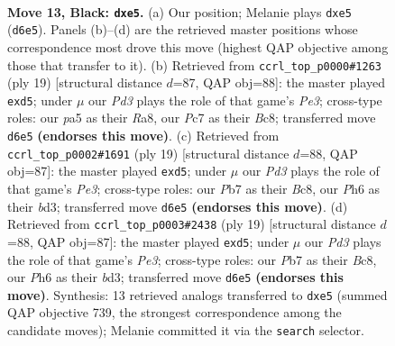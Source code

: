 \documentclass[11pt]{article}
\begin{document}
\clearpage

\begin{figure}[p]\centering
\begin{subfigure}{0.46\textwidth}\centering
\resizebox{\linewidth}{!}{%
\newchessgame
\chessboard[
  setfen={r1b1rk2/ppp1qpp1/2np1n1p/P3P2P/2P5/2P1PNP1/3B1P2/R2QKB1R b KQ - 0 13},
  showmover=false,
  pgfstyle=straightmove, color=movearrow, markmove={d6-e5}
]}
\caption{}
\end{subfigure}\hfill
\begin{subfigure}{0.46\textwidth}\centering
\resizebox{\linewidth}{!}{%
\newchessgame
\chessboard[
  setfen={r1bq1rk1/pp3pp1/2n1pn1p/2pP4/3P4/P1PBPN2/5PPP/R1BQ1RK1 b - - 0 10},
  showmover=false,
  pgfstyle=straightmove, color=movearrow, markmove={e6-d5}
]}
\caption{}
\end{subfigure}
\\[4pt]
\begin{subfigure}{0.46\textwidth}\centering
\resizebox{\linewidth}{!}{%
\newchessgame
\chessboard[
  setfen={r1bq1rk1/p4ppp/1pn1pn2/2pP4/3P4/P1PBPN2/5PPP/R1BQ1RK1 b - - 0 10},
  showmover=false,
  pgfstyle=straightmove, color=movearrow, markmove={e6-d5}
]}
\caption{}
\end{subfigure}\hfill
\begin{subfigure}{0.46\textwidth}\centering
\resizebox{\linewidth}{!}{%
\newchessgame
\chessboard[
  setfen={r1bq1rk1/p4ppp/1pn1pn2/2pP4/3P4/P1PBPN2/5PPP/R1BQ1RK1 b - - 0 10},
  showmover=false,
  pgfstyle=straightmove, color=movearrow, markmove={e6-d5}
]}
\caption{}
\end{subfigure}
\caption{\textbf{Move 13, Black: \texttt{dxe5}.} (a) Our position; Melanie plays \texttt{dxe5} (\texttt{d6e5}). Panels (b)--(d) are the retrieved master positions whose correspondence most drove this move (highest QAP objective among those that transfer to it). (b) Retrieved from \texttt{ccrl\_top\_p0000\#1263} (ply 19) [structural distance $d$=87, QAP obj=88]: the master played \texttt{exd5}; under $\mu$ our \emph{Pd3} plays the role of that game's \emph{Pe3}; cross-type roles: our \emph{p}a5 as their \emph{R}a8, our \emph{P}c7 as their \emph{B}c8; transferred move \texttt{d6e5} \textbf{(endorses this move)}. (c) Retrieved from \texttt{ccrl\_top\_p0002\#1691} (ply 19) [structural distance $d$=88, QAP obj=87]: the master played \texttt{exd5}; under $\mu$ our \emph{Pd3} plays the role of that game's \emph{Pe3}; cross-type roles: our \emph{P}b7 as their \emph{B}c8, our \emph{P}h6 as their \emph{b}d3; transferred move \texttt{d6e5} \textbf{(endorses this move)}. (d) Retrieved from \texttt{ccrl\_top\_p0003\#2438} (ply 19) [structural distance $d$=88, QAP obj=87]: the master played \texttt{exd5}; under $\mu$ our \emph{Pd3} plays the role of that game's \emph{Pe3}; cross-type roles: our \emph{P}b7 as their \emph{B}c8, our \emph{P}h6 as their \emph{b}d3; transferred move \texttt{d6e5} \textbf{(endorses this move)}. Synthesis: 13 retrieved analogs transferred to \texttt{dxe5} (summed QAP objective 739, the strongest correspondence among the candidate moves); Melanie committed it via the \texttt{search} selector.}
\label{fig:thought-m25}
\end{figure}
\end{document}
